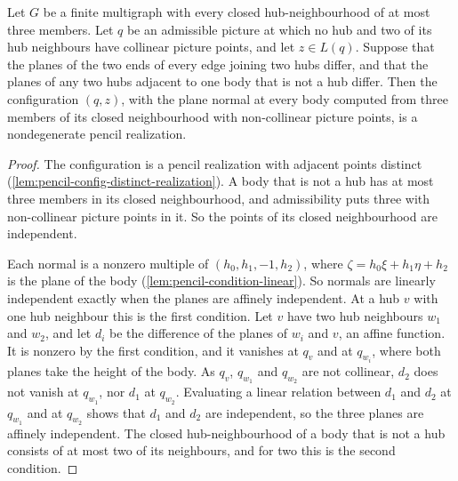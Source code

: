 \begin{lemma}
  \label{lem:pencil-x0-conjunct-three}
  \leanok
  Let $G$ be a finite multigraph with every closed hub-neighbourhood of at
  most three members. Let $q$ be an admissible picture at which no hub
  and two of its hub neighbours have collinear picture points, and let
  $z \in L(q)$. Suppose that the planes of the two ends of every edge
  joining two hubs differ, and that the planes of any two hubs adjacent to
  one body that is not a hub differ. Then the configuration $(q, z)$,
  with the plane normal at every body computed from three members of its
  closed neighbourhood with non-collinear picture points, is a
  nondegenerate pencil realization.
\end{lemma}
\begin{proof}
  \leanok
  The configuration is a pencil realization with adjacent points distinct
  (\cref{lem:pencil-config-distinct-realization}). A body that is not a
  hub has at most three members in its closed neighbourhood, and
  admissibility puts three with non-collinear picture points in it. So the
  points of its closed neighbourhood are independent.

  Each normal is a nonzero multiple of $(h_0, h_1, -1, h_2)$, where
  $\zeta = h_0 \xi + h_1 \eta + h_2$ is the plane of the body
  (\cref{lem:pencil-condition-linear}). So normals are linearly
  independent exactly when the planes are affinely independent. At a hub
  $v$ with one hub neighbour this is the first condition. Let $v$ have
  two hub neighbours $w_1$ and $w_2$, and let $d_i$ be the difference of
  the planes of $w_i$ and $v$, an affine function. It is nonzero by the
  first condition, and it vanishes at $q_v$ and at $q_{w_i}$, where both
  planes take the height of the body. As $q_v$, $q_{w_1}$ and $q_{w_2}$
  are not collinear, $d_2$ does not vanish at $q_{w_1}$, nor $d_1$ at
  $q_{w_2}$. Evaluating a linear relation between $d_1$ and $d_2$ at
  $q_{w_1}$ and at $q_{w_2}$ shows that $d_1$ and $d_2$ are independent,
  so the three planes are affinely independent. The closed
  hub-neighbourhood of a body that is not a hub consists of at most two
  of its neighbours, and for two this is the second condition.
\end{proof}


